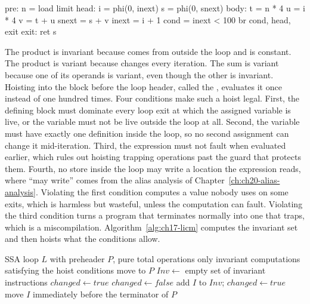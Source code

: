 \begin{irlisting}[caption={A loop whose body mixes an invariant address term with variant uses of the index.},label={lst:ch17-loop}]
pre:   n = load limit
head:  i = phi(0, inext)
       s = phi(0, snext)
body:  t = n * 4
       u = i * 4
       v = t + u
       snext = s + v
       inext = i + 1
       cond = inext < 100
       br cond, head, exit
exit:  ret s
\end{irlisting}

The product  is invariant because  comes from outside the loop and  is constant.
The product  is variant because  changes every iteration.
The sum  is variant because one of its operands is variant, even though the other is invariant.
Hoisting  into the block before the loop header, called the , evaluates it once instead of one hundred times.
Four conditions make such a hoist legal.
First, the defining block must dominate every loop exit at which the assigned variable is live, or the variable must not be live outside the loop at all.
Second, the variable must have exactly one definition inside the loop, so no second assignment can change it mid-iteration.
Third, the expression must not fault when evaluated earlier, which rules out hoisting trapping operations past the guard that protects them.
Fourth, no store inside the loop may write a location the expression reads, where \enquote{may write} comes from the alias analysis of Chapter~\ref{ch:ch20-alias-analysis}.
Violating the first condition computes a value nobody uses on some exits, which is harmless but wasteful, unless the computation can fault.
Violating the third condition turns a program that terminates normally into one that traps, which is a miscompilation.
Algorithm~\ref{alg:ch17-licm} computes the invariant set and then hoists what the conditions allow.

\begin{algorithm}
  \caption{Loop-invariant code motion to the preheader}\label{alg:ch17-licm}
  \begin{pseudocode}
    \Require SSA loop $L$ with preheader $P$, pure total operations only
    \Ensure invariant computations satisfying the hoist conditions move to $P$
    \State $Inv \gets$ empty set of invariant instructions
    \State $changed \gets true$
      \State $changed \gets false$
          \State add $I$ to $Inv$; $changed \gets true$
        \EndIf
      \EndFor
    \EndWhile
          \State move $I$ immediately before the terminator of $P$
        \EndIf
      \EndIf
    \EndFor
  \end{pseudocode}
\end{algorithm}

